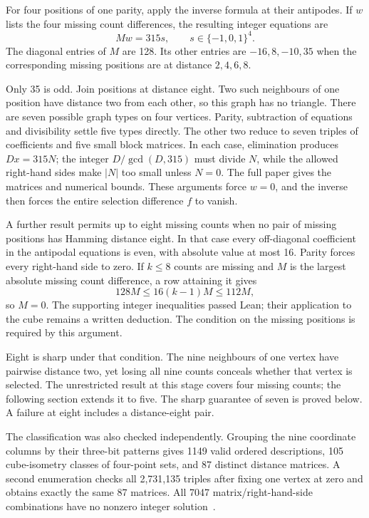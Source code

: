 \documentclass[11pt,a4paper]{article}
\begin{document}
For four positions of one parity, apply the inverse formula at their
antipodes. If $w$ lists the four missing count differences, the resulting
integer equations are
\[
Mw=315s,\qquad s\in\{-1,0,1\}^4.
\]
The diagonal entries of $M$ are 128. Its other entries are $-16,8,-10,35$
when the corresponding missing positions are at distance $2,4,6,8$.

Only 35 is odd. Join positions at distance eight. Two such neighbours
of one position have distance two from each other, so this graph has
no triangle. There are seven possible graph types on four vertices.
Parity, subtraction of equations and divisibility settle five types
directly. The other two reduce to seven triples of coefficients and
five small block matrices. In each case, elimination produces
$Dx=315N$; the integer $D/\gcd(D,315)$ must divide $N$, while the allowed
right-hand sides make $|N|$ too small unless $N=0$. The full paper gives
the matrices and numerical bounds. These arguments force $w=0$, and
the inverse then forces the entire selection difference $f$ to vanish.

A further result permits up to eight missing counts when no pair of
missing positions has Hamming distance eight. In that case every
off-diagonal coefficient in the antipodal equations is even, with
absolute value at most 16. Parity forces every right-hand side to zero.
If $k\le8$ counts are missing and $M$ is the largest absolute missing
count difference, a row attaining it gives
\[
128M\le16(k-1)M\le112M,
\]
so $M=0$. The supporting integer inequalities passed Lean; their
application to the cube remains a written deduction. The condition
on the missing positions is required by this argument.

Eight is sharp under that condition. The nine neighbours of one vertex
have pairwise distance two, yet losing all nine counts conceals whether
that vertex is selected. The unrestricted result at this stage covers four missing counts;
the following section extends it to five. The sharp guarantee of seven
is proved below. A failure at eight includes a distance-eight pair.

The classification was also checked independently. Grouping the nine
coordinate columns by their three-bit patterns gives 1149 valid
ordered descriptions, 105 cube-isometry classes of four-point sets,
and 87 distinct distance matrices. A second enumeration checks all
2,731,135 triples after fixing one vertex at zero and obtains exactly
the same 87 matrices. All 7047 matrix/right-hand-side combinations have
no nonzero integer solution~\cite{research239}.
\end{document}
